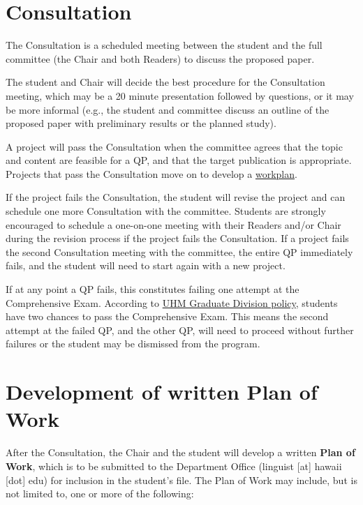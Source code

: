\documentclass[
]{book}
\begin{document}
\section{Consultation}\label{consultation}

The Consultation is a scheduled meeting between the student and the full committee (the Chair and both Readers) to discuss the proposed paper.

The student and Chair will decide the best procedure for the Consultation meeting, which may be a 20 minute presentation followed by questions, or it may be more informal (e.g., the student and committee discuss an outline of the proposed paper with preliminary results or the planned study).

A project will pass the Consultation when the committee agrees that the topic and content are feasible for a QP, and that the target publication is appropriate. Projects that pass the Consultation move on to develop a \hyperref[workplan]{workplan}.

If the project fails the Consultation, the student will revise the project and can schedule one more Consultation with the committee. Students are strongly encouraged to schedule a one-on-one meeting with their Readers and/or Chair during the revision process if the project fails the Consultation. If a project fails the second Consultation meeting with the committee, the entire QP immediately fails, and the student will need to start again with a new project.

If at any point a QP fails, this constitutes failing one attempt at the Comprehensive Exam. According to \href{http://www.manoa.hawaii.edu/graduate/content/doctorate}{UHM Graduate Division policy}, students have two chances to pass the Comprehensive Exam. This means the second attempt at the failed QP, and the other QP, will need to proceed without further failures or the student may be dismissed from the program.

\section{Development of written Plan of Work}\label{workplan}

After the Consultation, the Chair and the student will develop a written \textbf{Plan of Work}, which is to be submitted to the Department Office (linguist {[}at{]} hawaii {[}dot{]} edu) for inclusion in the student's file. The Plan of Work may include, but is not limited to, one or more of the following:
\end{document}

